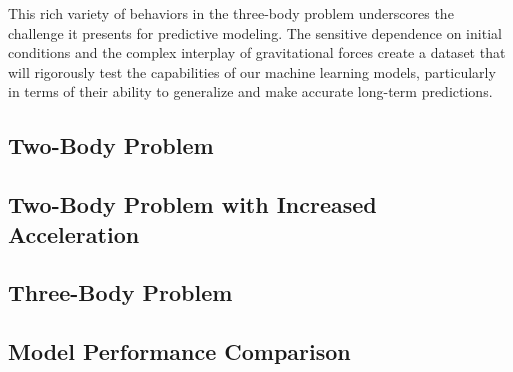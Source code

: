 \documentclass[12pt,a4paper]{article}
\begin{document}
This rich variety of behaviors in the three-body problem underscores the challenge it presents for predictive modeling. The sensitive dependence on initial conditions and the complex interplay of gravitational forces create a dataset that will rigorously test the capabilities of our machine learning models, particularly in terms of their ability to generalize and make accurate long-term predictions.

\subsection{Two-Body Problem}

\subsection{Two-Body Problem with Increased Acceleration}

\subsection{Three-Body Problem}


\subsection{Model Performance Comparison}
\end{document}
